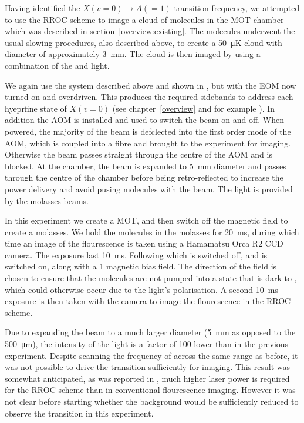 Having identified the $X(v=0)\rightarrow A(=1)$ transition frequency, we
attempted to use the RROC scheme to image a cloud of \CaF{} molecules in the
MOT chamber which was described in section~\ref{overview:existing}. The
molecules underwent the usual slowing procedures, also described above, to
create a \SI{50}{\micro\kelvin} cloud with diameter of approximately
\SI{3}{\milli\meter}. The cloud is then imaged by using a combination of the
 and  light.

We again use the  system described above and shown in
, but with the EOM now turned on and
overdriven. This produces the required sidebands to address each hyeprfine
state of $X(v=0)$ (see chapter~\ref{overview} and for example
). In addition the AOM is installed and used to switch
the beam on and off. When powered, the majority of the beam is defclected into
the first order mode of the AOM, which is coupled into a fibre and brought to
the experiment for imaging. Otherwise the beam passes straight through the
centre of the AOM and is blocked. At the chamber, the beam is expanded to
\SI{5}{\milli\meter} diameter and passes through the centre of the chamber
before being retro-reflected to increase the power delivery and avoid pusing
molecules with the beam. 
%
The  light is provided by the molasses beams.

In this experiment we create a MOT, and then switch off the magnetic field to
create a molasses. We hold the molecules in the molasses for
\SI{20}{\milli\second}, during which time an image of the flourescence is taken
using a Hamamatsu Orca R2 CCD camera.
The exposure last \SI{10}{\milli\second}. Following which  is
switched off, and  is switched on, along with a \SI{1}{\gauss}
magnetic bias field.  The direction of the field is chosen to ensure that the
molecules are not pumped into a state that is dark to , which
could otherwise occur due to the light's polarisation. A second
\SI{10}{\milli\second} exposure is then taken with the camera to image the
flourescence in the RROC scheme.

Due to expanding the beam to a much larger diameter (\SI{5}{\milli\meter} as
opposed to the \SI{500}{\micro\meter}), the intensity of the light is a factor
of 100 lower than in the previous experiment. Despite scanning the frequency of
 across the same range as before, it was not possible to drive the
transition sufficiently for imaging. This result was somewhat anticipated, as
was reported in , much higher laser power is required for
the RROC scheme than in conventional flourescence imaging. However it was
not clear before starting whether the background would be sufficiently reduced
to observe the transition in this experiment.

